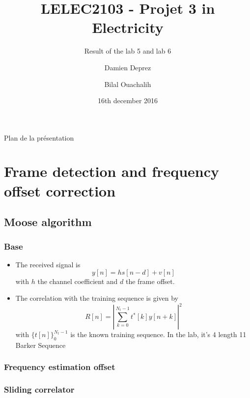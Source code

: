 \documentclass[11pt]{beamer}
\title{LELEC2103 - Projet 3 in Electricity}
\subtitle[\ldots]{Result of the lab 5 and lab 6}
\author[D. Deprez\and B. Ouachalih]{Damien Deprez\and Bilal Ouachalih}
\institute{EPL}
\date{16th december 2016}
\begin{document}
{
	\begin{frame}[noframenumbering]
		\titlepage
	\end{frame}
} 

{
	\begin{frame}[noframenumbering]{Plan de la présentation}
		\tableofcontents
	\end{frame}
}

\section{Frame detection and frequency offset correction}

\subsection{Moose algorithm}

\begin{frame}
\frametitle{Base}
\begin{itemize}
\item The received signal is
\begin{equation}
y[n] = hs[n-d] + v[n]
\end{equation}
with $h$ the channel coefficient and $d$ the frame offset.
\item The correlation with the training sequence is given by
\begin{equation}
R[n] = \left| \sum_{k=0}^{N_t-1} t^*[k]y[n+k] \right|^2
\end{equation}
with $\{t[n]\}_0^{N_t-1}$ is the known training sequence. In the lab, it's 4 length 11 Barker Sequence
\end{itemize}

\end{frame}


\subsubsection{Frequency estimation offset}
\begin{frame}
\frametitle{Sliding correlator}


\end{frame}

\subsubsection{}
\end{document}
